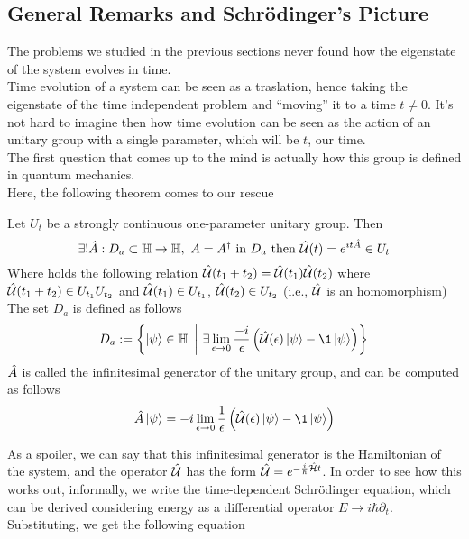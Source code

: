 \documentclass[../qm.tex]{subfiles}
\begin{document}
	\subsection{General Remarks and Schrödinger's Picture}
	The problems we studied in the previous sections never found how the eigenstate of the system evolves in time.\\
	Time evolution of a system can be seen as a traslation, hence taking the eigenstate of the time independent problem and ``moving'' it to a time $t\ne0$. It's not hard to imagine then how time evolution can be seen as the action of an unitary group with a single parameter, which will be $t$, our time.\\
	The first question that comes up to the mind is actually how this group is defined in quantum mechanics.\\
	Here, the following theorem comes to our rescue
	\begin{thm}
		Let $U_t$ be a strongly continuous one-parameter unitary group. Then
		\begin{equation*}
			\exists!\opr{A}:D_a\subset\mathbb{H}\to\mathbb{H},\ A=\adj{A}\text{ in }D_a\text{ then }\U(t)=e^{it\opr{A}}\in U_t
		\end{equation*}
		Where holds the following relation $\hat{\mathcal{U}}(t_1+t_2)=\hat{\mathcal{U}}(t_1)\hat{\mathcal{U}}(t_2)$ where $\hat{\mathcal{U}}(t_1+t_2)\in U_{t_1}U_{t_2}$ and $\hat{\mathcal{U}}(t_1)\in U_{t_1}$, $\hat{\mathcal{U}}(t_2)\in U_{t_2}$ (i.e., $\hat{\mathcal{U}}$ is an homomorphism)\\
		The set $D_a$ is defined as follows
		\begin{equation*}
		D_a:=\left\{ \ket{\psi}\in\mathbb{H}\ \left|\ \exists\lim_{\epsilon\to0}\frac{-i}{\epsilon}\left( \U(\epsilon)\ket{\psi}-\1\ket{\psi} \right) \right\}\right.
		\end{equation*}
		$\hat{A}$ is called the infinitesimal generator of the unitary group, and can be computed as follows
		\begin{equation*}
			\opr{A}\ket{\psi}=-i\lim_{\epsilon\to0}\frac{1}{\epsilon}\left( \U(\epsilon)\ket{\psi}-\1\ket{\psi} \right)
		\end{equation*}
	\end{thm}
	As a spoiler, we can say that this infinitesimal generator is the Hamiltonian of the system, and the operator $\hat{\mathcal{U}}$ has the form $\hat{\mathcal{U}}=e^{-\frac{i}{\hbar}\hat{\mathcal{H}}t}$. In order to see how this works out, informally, we write the time-dependent Schrödinger equation, which can be derived considering energy as a differential operator $E\to i\hbar\partial_t$. Substituting, we get the following equation
\end{document}
